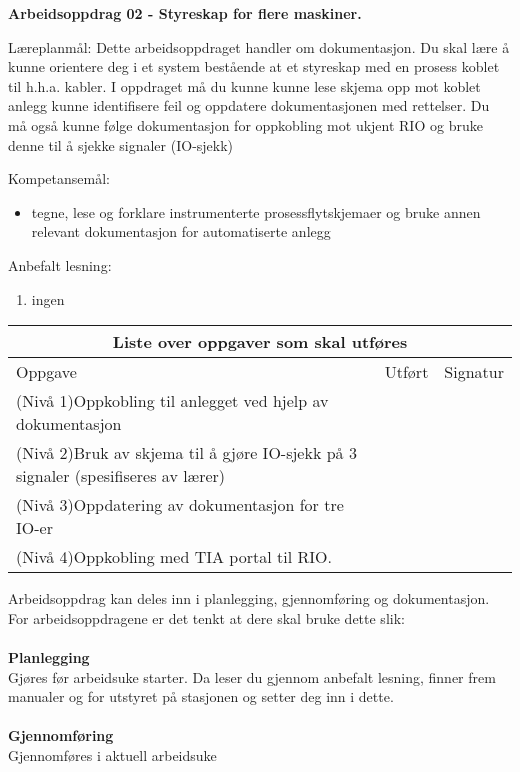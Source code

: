 
\noindent
{\bf Arbeidsoppdrag 02 - Styreskap for flere maskiner.}

\vskip 5pt
Læreplanmål:
Dette arbeidsoppdraget handler om dokumentasjon. Du skal lære å kunne orientere deg i et system bestående at et styreskap med en prosess koblet til h.h.a. kabler. I oppdraget må du kunne kunne lese skjema opp mot koblet anlegg kunne identifisere feil og oppdatere dokumentasjonen med rettelser. Du må også kunne følge dokumentasjon for oppkobling mot ukjent RIO og bruke denne til å sjekke signaler (IO-sjekk)

Kompetansemål:
\begin{itemize}[noitemsep]
	\item tegne, lese og forklare instrumenterte prosessflytskjemaer og bruke annen relevant dokumentasjon for automatiserte anlegg
\end{itemize}

Anbefalt lesning:

\begin{enumerate}
	\item ingen 
\end{enumerate}


\begin{center}
\begin{tabular}{ | m{10cm} | m{1cm}| m{2cm} | } 
\hline
\multicolumn{3}{|c|}{Liste over oppgaver som skal utføres} \\
	\hline
	Oppgave	& Utført & Signatur \\ 
	\hline
	\hline
	\cellcolor{green!60}(Nivå 1)Oppkobling til anlegget ved hjelp av dokumentasjon	& & \\ 
	\hline
	\cellcolor{yellow!60}(Nivå 2)Bruk av skjema til å gjøre IO-sjekk på 3 signaler (spesifiseres av lærer)
	& & \\ 
	\hline
	\cellcolor{orange!60}(Nivå 3)Oppdatering av dokumentasjon for tre IO-er
	& & \\ 
	\hline
	\cellcolor{red!60}(Nivå 4)Oppkobling med TIA portal til RIO. 
	& & \\ 
	\hline
\end{tabular}
\end{center}

Arbeidsoppdrag kan deles inn i planlegging, gjennomføring og dokumentasjon.\\
For arbeidsoppdragene er det tenkt at dere skal bruke dette slik:\\\\
\textbf{Planlegging}\\
Gjøres før arbeidsuke starter. Da leser du gjennom anbefalt lesning, finner frem manualer og for  utstyret på stasjonen og setter deg inn i dette.\\ \\
\textbf{Gjennomføring}\\
Gjennomføres i aktuell arbeidsuke\\\\

